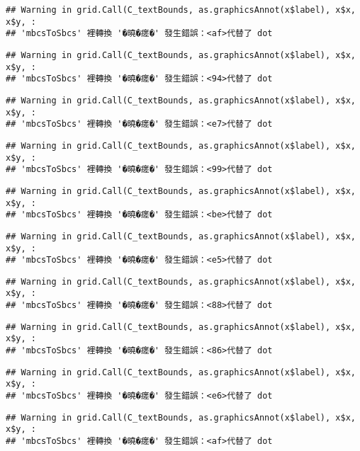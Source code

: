 \documentclass[
]{article}
\begin{document}
\begin{verbatim}
## Warning in grid.Call(C_textBounds, as.graphicsAnnot(x$label), x$x, x$y, :
## 'mbcsToSbcs' 裡轉換 '�曉�瘥�' 發生錯誤：<af>代替了 dot
\end{verbatim}

\begin{verbatim}
## Warning in grid.Call(C_textBounds, as.graphicsAnnot(x$label), x$x, x$y, :
## 'mbcsToSbcs' 裡轉換 '�曉�瘥�' 發生錯誤：<94>代替了 dot
\end{verbatim}

\begin{verbatim}
## Warning in grid.Call(C_textBounds, as.graphicsAnnot(x$label), x$x, x$y, :
## 'mbcsToSbcs' 裡轉換 '�曉�瘥�' 發生錯誤：<e7>代替了 dot
\end{verbatim}

\begin{verbatim}
## Warning in grid.Call(C_textBounds, as.graphicsAnnot(x$label), x$x, x$y, :
## 'mbcsToSbcs' 裡轉換 '�曉�瘥�' 發生錯誤：<99>代替了 dot
\end{verbatim}

\begin{verbatim}
## Warning in grid.Call(C_textBounds, as.graphicsAnnot(x$label), x$x, x$y, :
## 'mbcsToSbcs' 裡轉換 '�曉�瘥�' 發生錯誤：<be>代替了 dot
\end{verbatim}

\begin{verbatim}
## Warning in grid.Call(C_textBounds, as.graphicsAnnot(x$label), x$x, x$y, :
## 'mbcsToSbcs' 裡轉換 '�曉�瘥�' 發生錯誤：<e5>代替了 dot
\end{verbatim}

\begin{verbatim}
## Warning in grid.Call(C_textBounds, as.graphicsAnnot(x$label), x$x, x$y, :
## 'mbcsToSbcs' 裡轉換 '�曉�瘥�' 發生錯誤：<88>代替了 dot
\end{verbatim}

\begin{verbatim}
## Warning in grid.Call(C_textBounds, as.graphicsAnnot(x$label), x$x, x$y, :
## 'mbcsToSbcs' 裡轉換 '�曉�瘥�' 發生錯誤：<86>代替了 dot
\end{verbatim}

\begin{verbatim}
## Warning in grid.Call(C_textBounds, as.graphicsAnnot(x$label), x$x, x$y, :
## 'mbcsToSbcs' 裡轉換 '�曉�瘥�' 發生錯誤：<e6>代替了 dot
\end{verbatim}

\begin{verbatim}
## Warning in grid.Call(C_textBounds, as.graphicsAnnot(x$label), x$x, x$y, :
## 'mbcsToSbcs' 裡轉換 '�曉�瘥�' 發生錯誤：<af>代替了 dot
\end{verbatim}
\end{document}
